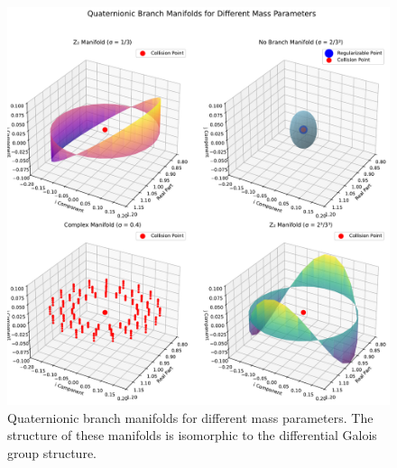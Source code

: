 \begin{figure}[htbp]
  \centering
  \includegraphics[width=\textwidth]{quaternionic_manifold_comparison.pdf}
  \caption{Quaternionic branch manifolds for different mass parameters. The structure of these manifolds is isomorphic to the differential Galois group structure.}
  \label{fig:quaternionic_manifold_comparison}
\end{figure}

